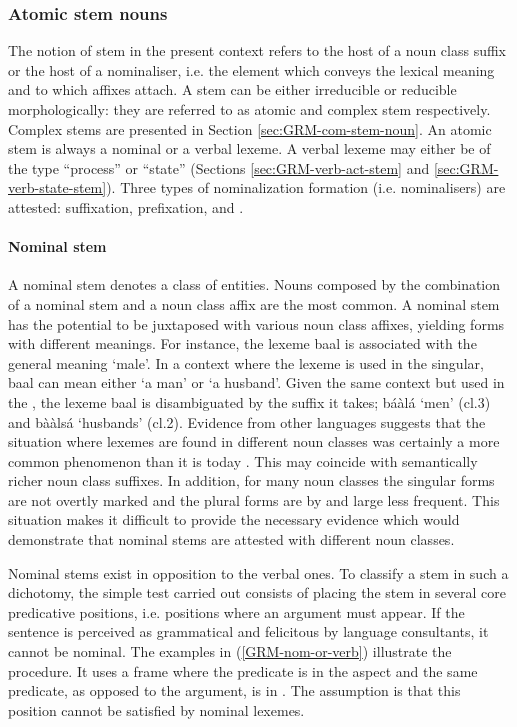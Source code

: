 \begin{exe}
\begin{exe}
\begin{exe}
\begin{exe}
\begin{exe}
\begin{exe}
\subsubsection{Atomic stem nouns}
\label{sec:GRM-sim-bas-noun}

The notion of stem in the present context refers to the host of a noun class suffix or the  host of a nominaliser, i.e. the element which conveys the lexical meaning and  to which affixes attach. A stem can be either irreducible or reducible morphologically: they are referred to as atomic  and complex stem respectively.  Complex stems are presented in  Section \ref{sec:GRM-com-stem-noun}.   An atomic stem is always a  nominal or a verbal lexeme.  A verbal lexeme may either be of the type ``process'' or  ``state'' (Sections \ref{sec:GRM-verb-act-stem} and \ref{sec:GRM-verb-state-stem}). Three types of nominalization formation (i.e. nominalisers) are attested: suffixation, prefixation, and .  


\largerpage[-1]
\paragraph{Nominal  stem}
\label{sec:GRM-nom-stem}

A nominal stem denotes a class of entities.   Nouns composed by the combination of  a nominal stem and a noun class affix are the most common. A nominal stem has the potential to be juxtaposed with various noun class affixes, yielding forms with different meanings. For instance, the lexeme {\sls baal} is associated with the general meaning `male'. In a context where the lexeme is used in the singular, {\sls baal} can mean either `a man' or `a husband'. Given the same context but used in the , the lexeme {\sls baal} is disambiguated by the  suffix it takes;  {\sls báàlá} `men'  ({\sc cl.3}) and  {\sls bààlsá} `husbands'  ({\sc cl.2}).  Evidence from other  languages suggests that the situation where lexemes are found in different noun classes was certainly a   more common phenomenon than it is today \citep[126--128]{Bonv88}. This may coincide with semantically richer noun class suffixes. In addition, for many noun classes the singular forms are not overtly marked and the plural forms are by and large less frequent. This situation makes it difficult to provide the necessary evidence which would demonstrate that nominal stems are attested with different noun classes.  

Nominal stems exist in opposition to the verbal ones. To classify a stem in such a dichotomy, the simple test carried out consists of placing the stem in several core predicative positions, i.e. positions where an argument must appear. If the sentence is perceived as grammatical and felicitous by language consultants, it cannot be nominal.  The examples in (\ref{GRM-nom-or-verb}) illustrate the procedure. It uses a frame where the predicate is in the  aspect and  the same predicate, as opposed to the argument,  is in . The assumption is that this position  cannot be satisfied by nominal lexemes.


\end{exe}
\end{exe}
\end{exe}
\end{exe}
\end{exe}
\end{exe}
